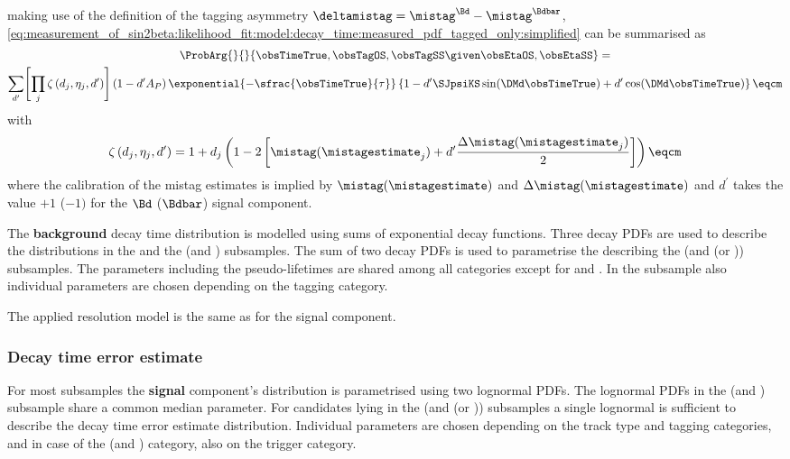making use of the definition of the tagging asymmetry $\deltamistag =
\mistag^{\Bd} - \mistag^{\Bdbar}$, 
\cref{eq:measurement_of_sin2beta:likelihood_fit:model:decay_time:measured_pdf_tagged_only:simplified} 
can be summarised as
%
\begin{multline}
  \ProbArg{}{}{\obsTimeTrue, \obsTagOS, \obsTagSS \given \obsEtaOS, \obsEtaSS} = \\
  \sum_{d^\prime} \Biggl[ \prod_{j} \zeta \left( d_j, \eta_j, d^{\prime} \right) \Biggr] \left( 1 - d^\prime A_P \right) \exponential{-\sfrac{\obsTimeTrue}{\tau}} \left\{ 1 - d^\prime \SJpsiKS \sin (\DMd \obsTimeTrue) + d^\prime \cos (\DMd \obsTimeTrue) \right\} \eqcm
\end{multline}
%
with
%
\begin{equation}
  \zeta \left( d_j, \eta_j, d^{\prime} \right) = 1 + d_j \left( 1 - 2 \left[ \mistag(\mistagestimate_j) + d^{\prime} \frac{\Delta\mistag(\mistagestimate_j)}{2} \right] \right) \eqcm
\end{equation}
%
where the calibration of the mistag estimates is implied by
$\mistag(\mistagestimate)$ and $\Delta\mistag(\mistagestimate)$ and $d^\prime$
takes the value $+1$ ($-1)$ for the $\Bd$ ($\Bdbar$) signal component.

The \textbf{background} decay time distribution is modelled using sums of
exponential decay functions. Three decay \acp{PDF} are used to describe the
distributions in the \catLL and the (\catDD and \catOS) subsamples. The sum of
two decay \acp{PDF} is used to parametrise the \PDF describing the (\catDD and
(\catSS or \catBS)) subsamples. The \PDF parameters including the
pseudo-lifetimes are shared among all categories except for \catDD and \catLL.
In the \catDD subsample also individual parameters are chosen depending on the
tagging category. 

The applied resolution model is the same as for the signal component.

\subsubsection{Decay time error estimate}
\label{sec:measurement_of_sin2beta:likelihood_fit:model:decay_time_error}

For most subsamples the \textbf{signal} component's distribution is parametrised
using two lognormal \acp{PDF}. The lognormal \acp{PDF} in the (\catLL and
\catOS) subsample share a common median parameter. For candidates lying in the
(\catLL and (\catSS or \catBS)) subsamples a single lognormal \PDF is sufficient
to describe the decay time error estimate distribution. Individual parameters
are chosen depending on the track type and tagging categories, and in case of
the (\catDD and \catOS) category, also on the trigger category.

